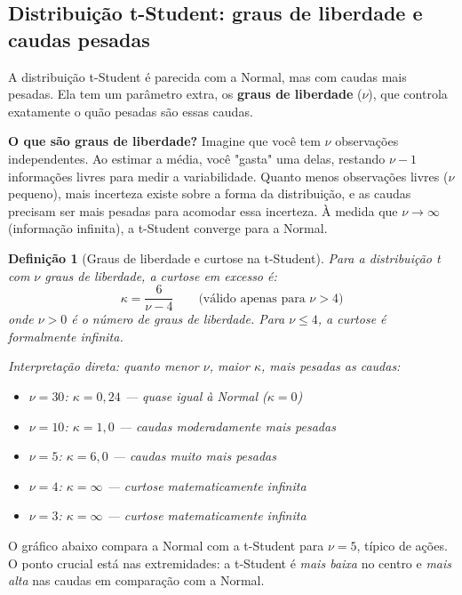 \documentclass[11pt,a4paper]{article}
\theoremstyle{quant}
\newtheorem{definicao}{Definição}[section]
\begin{document}
\subsection{Distribuição t-Student: graus de liberdade e caudas pesadas}

A distribuição t-Student é parecida com a Normal, mas com caudas mais pesadas.
Ela tem um parâmetro extra, os \textbf{graus de liberdade} ($\nu$), que controla
exatamente o quão pesadas são essas caudas.

\textbf{O que são graus de liberdade?} Imagine que você tem $\nu$ observações independentes.
Ao estimar a média, você "gasta" uma delas, restando $\nu - 1$ informações livres para
medir a variabilidade. Quanto menos observações livres ($\nu$ pequeno), mais incerteza
existe sobre a forma da distribuição, e as caudas precisam ser mais pesadas para
acomodar essa incerteza. À medida que $\nu \to \infty$ (informação infinita), a
t-Student converge para a Normal.

\begin{definicao}[Graus de liberdade e curtose na t-Student]
Para a distribuição t com $\nu$ graus de liberdade, a curtose em excesso é:
\[
  \kappa = \frac{6}{\nu - 4} \qquad \text{(válido apenas para } \nu > 4\text{)}
\]
onde $\nu > 0$ é o número de graus de liberdade.
Para $\nu \leq 4$, a curtose é formalmente infinita.

Interpretação direta: quanto menor $\nu$, maior $\kappa$, mais pesadas as caudas:
\begin{itemize}
  \item $\nu = 30$: $\kappa = 0{,}24$ --- quase igual à Normal ($\kappa = 0$)
  \item $\nu = 10$: $\kappa = 1{,}0$ \phantom{0}--- caudas moderadamente mais pesadas
  \item $\nu = 5$:\; $\kappa = 6{,}0$ \phantom{0}--- caudas muito mais pesadas
  \item $\nu = 4$:\; $\kappa = \infty$ --- curtose matematicamente infinita
  \item $\nu = 3$:\; $\kappa = \infty$ --- curtose matematicamente infinita
\end{itemize}
\end{definicao}

O gráfico abaixo compara a Normal com a t-Student para $\nu = 5$, típico de ações.
O ponto crucial está nas extremidades: a t-Student é \emph{mais baixa} no centro
e \emph{mais alta} nas caudas em comparação com a Normal.
\end{document}
